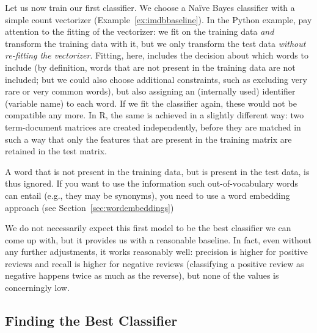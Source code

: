 Let us now train our first classifier. We choose a Na\"ive Bayes
classifier with a simple count vectorizer (Example~\ref{ex:imdbbaseline}).  In
the Python example, pay attention to the fitting of the vectorizer: we
fit on the training data \emph{and} transform the training data with
it, but we only transform the test data \emph{without re-fitting the
  vectorizer}. Fitting, here, includes the decision about which words to
include (by definition, words that are not present in the training
data are not included; but we could also choose additional
constraints, such as excluding very rare or very common words), but
also assigning an (internally used) identifier (variable name) to each
word. If we  fit the classifier again, these would not be
compatible any more. In R, the same is achieved in a slightly
different way: two term-document matrices are created independently,
before they are matched in such a way that only the features that are
present in the training matrix are retained in the test matrix.


\begin{feature}
  A word that is not present in the training data, but is present
  in the test data, is thus ignored. If you want to use the
  information such out-of-vocabulary words can entail (e.g., they may
  be synonyms), you need to use a word embedding approach (see Section~\ref{sec:wordembeddings})
\end{feature}

We do not necessarily expect this first model to be the best
classifier we can come up with, but it provides us with a reasonable
baseline. In fact, even without any further adjustments, it works
reasonably well: precision is higher for positive reviews and recall
is higher for negative reviews (classifying a positive review as
negative happens twice as much as the reverse), but none of the values
is concerningly low.




\subsection{Finding the Best Classifier}\label{sec:bestclassifier}



